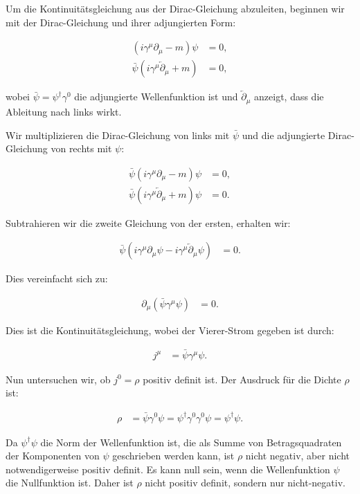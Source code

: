 Um die Kontinuitätsgleichung aus der Dirac-Gleichung abzuleiten, beginnen wir mit der Dirac-Gleichung und ihrer adjungierten Form:

\begin{align*}
(i \gamma^\mu \partial_\mu - m) \psi &= 0, \\
\bar{\psi} (i \gamma^\mu \overleftarrow{\partial}_\mu + m) &= 0,
\end{align*}

wobei \(\bar{\psi} = \psi^\dagger \gamma^0\) die adjungierte Wellenfunktion ist und \(\overleftarrow{\partial}_\mu\) anzeigt, dass die Ableitung nach links wirkt.

Wir multiplizieren die Dirac-Gleichung von links mit \(\bar{\psi}\) und die adjungierte Dirac-Gleichung von rechts mit \(\psi\):

\begin{align*}
\bar{\psi} (i \gamma^\mu \partial_\mu - m) \psi &= 0, \\
\bar{\psi} (i \gamma^\mu \overleftarrow{\partial}_\mu + m) \psi &= 0.
\end{align*}

Subtrahieren wir die zweite Gleichung von der ersten, erhalten wir:

\begin{align*}
\bar{\psi} (i \gamma^\mu \partial_\mu \psi - i \gamma^\mu \overleftarrow{\partial}_\mu \psi) &= 0.
\end{align*}

Dies vereinfacht sich zu:

\begin{align*}
\partial_\mu (\bar{\psi} \gamma^\mu \psi) &= 0.
\end{align*}

Dies ist die Kontinuitätsgleichung, wobei der Vierer-Strom gegeben ist durch:

\begin{align*}
j^\mu &= \bar{\psi} \gamma^\mu \psi.
\end{align*}

Nun untersuchen wir, ob \(j^0 = \rho\) positiv definit ist. Der Ausdruck für die Dichte \(\rho\) ist:

\begin{align*}
\rho &= \bar{\psi} \gamma^0 \psi = \psi^\dagger \gamma^0 \gamma^0 \psi = \psi^\dagger \psi.
\end{align*}

Da \(\psi^\dagger \psi\) die Norm der Wellenfunktion ist, die als Summe von Betragsquadraten der Komponenten von \(\psi\) geschrieben werden kann, ist \(\rho\) nicht negativ, aber nicht notwendigerweise positiv definit. Es kann null sein, wenn die Wellenfunktion \(\psi\) die Nullfunktion ist. Daher ist \(\rho\) nicht positiv definit, sondern nur nicht-negativ.

